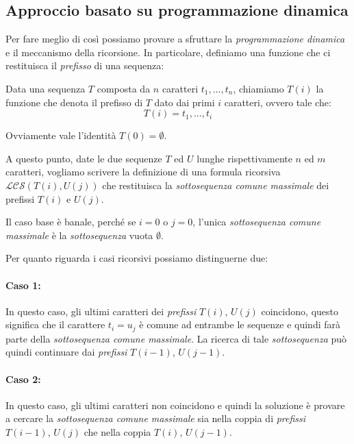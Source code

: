 \subsection{Approccio basato su programmazione dinamica}
Per fare meglio di così possiamo provare a sfruttare la \emph{programmazione
dinamica} e il meccanismo della ricorsione. In particolare, definiamo una
funzione che ci restituisca il \emph{prefisso} di una sequenza:
\begin{definition}[Prefisso]
    Data una sequenza $T$ composta da $n$ caratteri $t_1,\dots, t_n$,
    chiamiamo $T(i)$ la funzione che denota il prefisso di $T$ dato dai
    primi $i$ caratteri, ovvero tale che:
    \[T(i)=t_1,\dots, t_i\]
\end{definition}
\begin{note}
    Ovviamente vale l'identità $T(0)=\emptyset$.
\end{note}\noindent
A questo punto, date le due sequenze $T$ ed $U$ lunghe rispettivamente $n$ ed
$m$ caratteri, vogliamo scrivere la definizione di una formula ricorsiva
$\mathcal{LCS}(T(i),U(j))$ che restituisca la \emph{sottosequenza comune
massimale} dei prefissi $T(i)$ e $U(j)$.

Il caso base è banale, perché se $i=0$ o $j=0$, l'unica \emph{sottosequenza
comune massimale} è la \emph{sottosequenza} vuota $\emptyset$.

Per quanto riguarda i casi ricorsivi possiamo distinguerne due:

\paragraph{Caso 1: } In questo caso, gli ultimi caratteri dei
\emph{prefissi} $T(i)$, $U(j)$ coincidono, questo significa che il carattere
$t_i=u_j$ è comune ad entrambe le sequenze e quindi farà parte della
\emph{sottosequenza comune massimale}. La ricerca di tale \emph{sottosequenza}
può quindi continuare dai \emph{prefissi} $T(i-1)$, $U(j-1)$.

\paragraph{Caso 2: } In questo caso, gli ultimi caratteri non
coincidono e quindi la soluzione è provare a cercare la \emph{sottosequenza
comune massimale} sia nella coppia di \emph{prefissi} $T(i-1)$, $U(j)$ che nella
coppia $T(i)$, $U(j-1)$.

